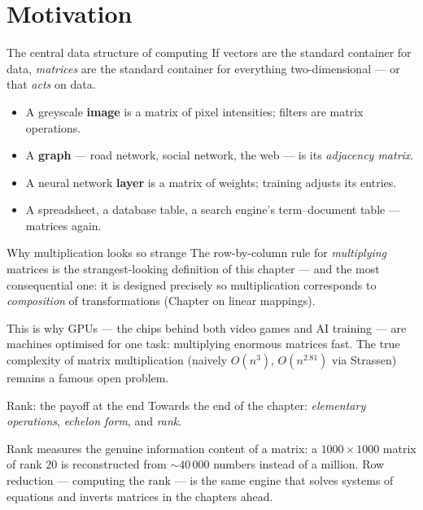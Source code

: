

\section{Motivation}

\begin{frame}{The central data structure of computing}
If vectors are the standard container for data, \emph{matrices} are the standard container for everything
two-dimensional — or that \emph{acts} on data.

\begin{itemize}
\item A greyscale \textbf{image} is a matrix of pixel intensities; filters are matrix operations.
\pause
\item A \textbf{graph} — road network, social network, the web — is its \emph{adjacency matrix}.
\pause
\item A neural network \textbf{layer} is a matrix of weights; training adjusts its entries.
\pause
\item A spreadsheet, a database table, a search engine's term–document table — matrices again.
\end{itemize}
\end{frame}

\begin{frame}{Why multiplication looks so strange}
The row-by-column rule for \emph{multiplying} matrices is the strangest-looking definition of this chapter
— and the most consequential one: it is designed precisely so multiplication corresponds to
\emph{composition} of transformations (Chapter on linear mappings).

\pause

\begin{remark}
This is why GPUs — the chips behind both video games and AI training — are machines optimised for one
task: multiplying enormous matrices fast. The true complexity of matrix multiplication (naively $O(n^3)$,
$O(n^{2.81})$ via Strassen) remains a famous open problem.
\end{remark}
\end{frame}

\begin{frame}{Rank: the payoff at the end}
Towards the end of the chapter: \emph{elementary operations}, \emph{echelon form}, and \emph{rank}.

\pause

\begin{remark}
Rank measures the genuine information content of a matrix: a $1000\times 1000$ matrix of rank $20$ is
reconstructed from $\sim 40\,000$ numbers instead of a million. Row reduction — computing the rank — is the
same engine that solves systems of equations and inverts matrices in the chapters ahead.
\end{remark}
\end{frame}

